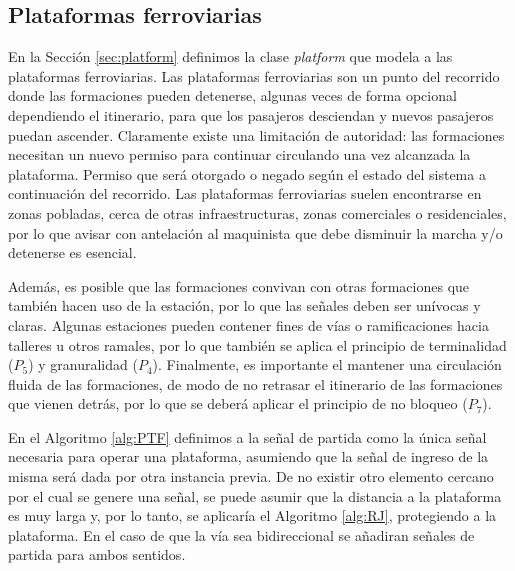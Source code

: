 \subsection{Plataformas ferroviarias}


    En la Sección \ref{sec:platform} definimos la clase \textit{platform} que modela a las plataformas ferroviarias. Las plataformas ferroviarias son un punto del recorrido donde las formaciones pueden detenerse, algunas veces de forma opcional dependiendo el itinerario, para que los pasajeros desciendan y nuevos pasajeros puedan ascender. Claramente existe una limitación de autoridad: las formaciones necesitan un nuevo permiso para continuar circulando una vez alcanzada la plataforma. Permiso que será otorgado o negado según el estado del sistema a continuación del recorrido. Las plataformas ferroviarias suelen encontrarse en zonas pobladas, cerca de otras infraestructuras, zonas comerciales o residenciales, por lo que avisar con antelación al maquinista que debe disminuir la marcha y/o detenerse es esencial.

    Además, es posible que las formaciones convivan con otras formaciones que también hacen uso de la estación, por lo que las señales deben ser unívocas y claras. Algunas estaciones pueden contener fines de vías o ramificaciones hacia talleres u otros ramales, por lo que también se aplica el principio de terminalidad ($P_5$) y granuralidad ($P_4$). Finalmente, es importante el mantener una circulación fluida de las formaciones, de modo de no retrasar el itinerario de las formaciones que vienen detrás, por lo que se deberá aplicar el principio de no bloqueo ($P_7$).

    En el Algoritmo \ref{alg:PTF} definimos a la señal de partida como la única señal necesaria para operar una plataforma, asumiendo que la señal de ingreso de la misma será dada por otra instancia previa. De no existir otro elemento cercano por el cual se genere una señal, se puede asumir que la distancia a la plataforma es muy larga y, por lo tanto, se aplicaría el Algoritmo \ref{alg:RJ}, protegiendo a la plataforma. En el caso de que la vía sea bidireccional se añadiran señales de partida para ambos sentidos.

